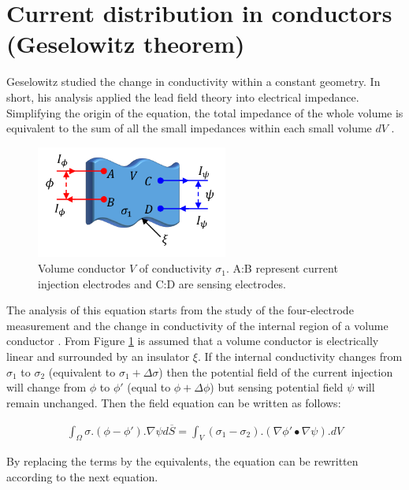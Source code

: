 \section{Current distribution in conductors (Geselowitz theorem)}  %
\label{section impedance Geselowitz}
Geselowitz \cite{geselowitz1971application} studied the change in conductivity within a constant geometry. In short, his analysis applied the lead field theory into electrical impedance. Simplifying the origin of the equation, the total impedance of the whole volume is equivalent to the sum of all the small impedances within each small volume $dV$ \cite{martinsen2011bioimpedance}.

\begin{figure}[!htpb]
	\centering
	\includegraphics[width=6.3cm,keepaspectratio]{figure9}    
	\caption[Volume conductor with 4 electrodes]{Volume conductor $V$ of conductivity $\sigma_1$. A:B represent current injection electrodes and C:D are sensing electrodes.}
	\label{fig:volume}
\end{figure}

The analysis of this equation starts from the study of the four-electrode measurement and the change in conductivity of the internal region of a volume conductor \cite{bertemes2002tissue}. From Figure \ref{fig:volume} is assumed that a volume conductor is electrically linear and surrounded by an insulator $\xi$. If the internal conductivity changes from $\sigma_1$ to $\sigma_2$ (equivalent to $\sigma_1+\Delta \sigma$) then the potential field of the current injection will change from $\phi$ to $\phi \prime$ (equal to $\phi+\Delta \phi$) but sensing potential field $\psi$ will remain unchanged. Then the field equation can be written as follows:

\begin{align}
	\label{eq:potential field}
	\int_{\Omega} \sigma . (\phi - \phi \prime) . \nabla \psi d \overline{S} = \int_{V} (\sigma_1 - \sigma_2).(\nabla \phi \prime \bullet \nabla \psi).dV 
\end{align}

By replacing the terms by the equivalents, the equation can be rewritten according to the next equation.

